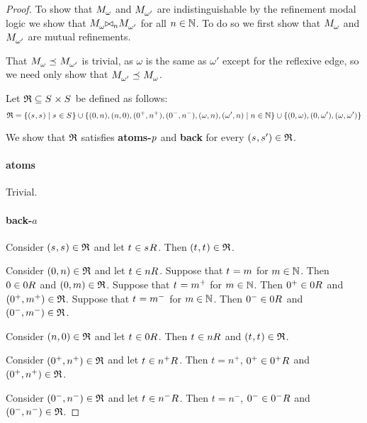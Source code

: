 \begin{proof}
To show that $\kPModel{\omega}$ and $\kPModel{\omega'}$ are indistinguishable by the refinement modal logic we show that $\kPModel{\omega} \bisimref[n] \kPModel{\omega'}$ for all $n \in \mathbb{N}$. To do so we first show that $\kPModel{\omega}$ and $\kPModel{\omega'}$ are mutual refinements.

That $\kPModel{\omega} \refines \kPModel{\omega'}$ is trivial, as $\omega$ is the same as $\omega'$ except for the reflexive edge, so we need only show that $\kPModel{\omega'} \refines \kPModel{\omega}$.

Let $\refinement \subseteq \kStates \times \kStates$ be defined as follows:
$$
\refinement = \{(\kStateS, \kStateS) \mid \kStateS \in \kStates\} \cup
\{(0, n), (n, 0), (0^+, n^+), (0^-, n^-), (\omega, n), (\omega', n) \mid n \in \naturals\} \cup
\{(0, \omega), (0, \omega'), (\omega, \omega')\}
$$

We show that $\mathfrak{R}$ satisfies {\bf atoms-$p$} and {\bf back} for every $(\kStateS, \kStateSP) \in \refinement$.

\paragraph{atoms}
Trivial.

\paragraph{back-$a$}
Consider $(\kStateS, \kStateS) \in \refinement$ and let $\kStateT \in \kSuccessors{}{\kStateS}$. Then $(\kStateT, \kStateT) \in \refinement$.

Consider $(0, n) \in \mathfrak{R}$ and let $\kStateT \in \kSuccessors{}{n}$. 
Suppose that $\kStateT = m$ for $m \in \mathbb{N}$. 
Then $0 \in \kSuccessors{}{0}$ and $(0, m) \in \mathfrak{R}$.
Suppose that $\kStateT = m^+$ for $m \in \mathbb{N}$.
Then $0^+ \in \kSuccessors{}{0}$ and $(0^+, m^+) \in \mathfrak{R}$.
Suppose that $\kStateT = m^-$ for $m \in \mathbb{N}$.
Then $0^- \in \kSuccessors{}{0}$ and $(0^-, m^-) \in \mathfrak{R}$.

Consider $(n, 0) \in \mathfrak{R}$ and let $\kStateT \in \kSuccessors{}{0}$.
Then $\kStateT \in \kSuccessors{}{n}$ and $(\kStateT, \kStateT) \in \refinement$.

Consider $(0^+, n^+) \in \mathfrak{R}$ and let $\kStateT \in \kSuccessors{}{n^+}$. 
Then $t = n^+$, $0^+ \in \kSuccessors{}{0^+}$ and $(0^+, n^+) \in \mathfrak{R}$.

Consider $(0^-, n^-) \in \mathfrak{R}$ and let $\kStateT \in \kSuccessors{}{n^-}$. 
Then $t = n^-$, $0^- \in \kSuccessors{}{0^-}$ and $(0^-, n^-) \in \mathfrak{R}$.


\end{proof}
